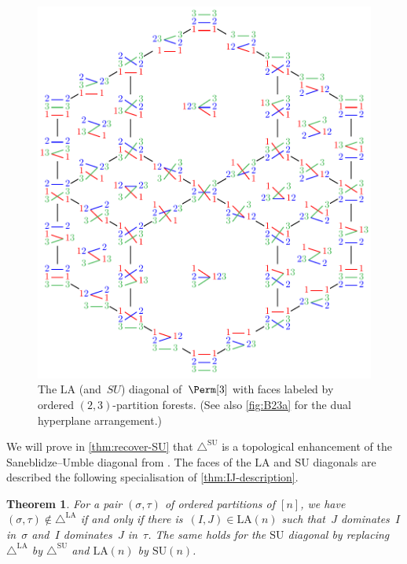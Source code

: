 \documentclass{amsart}
\newtheorem{theorem}{Theorem}[section]
\theoremstyle{definition}
\newcommand{\SU}{\mathrm{SU}}
\newcommand{\LA}{\mathrm{LA}}
\newcommand{\SUD}{\triangle^{\mathrm{SU}}}
\newcommand{\LAD}{\triangle^{\mathrm{LA}}}
\begin{document}
\begin{figure}
	\centerline{\includegraphics[scale=1]{diagonalPermutahedron3}}
	\caption{The $\LA$ (and~$SU$) diagonal of~$\Perm[3]$ with faces labeled by ordered $(2,3)$-partition forests. (See also \cref{fig:B23a} for the dual hyperplane arrangement.)}
	\label{fig:LUSAdiagonals}
\end{figure}

We will prove in \cref{thm:recover-SU} that $\SUD$ is a topological enhancement of the Saneblidze--Umble diagonal from \cite{SaneblidzeUmble}.
The faces of the $\LA$ and $\SU$ diagonals are described the following specialisation of \cref{thm:IJ-description}.

\begin{theorem}
\label{thm:minimal}
For a pair $(\sigma,\tau)$ of ordered partitions of $[n]$, we have~$(\sigma,\tau) \notin \LAD$ if and only if there is~$(I,J) \in \LA(n)$ such that~$J$ dominates~$I$ in~$\sigma$ and~$I$ dominates~$J$ in~$\tau$.
The same holds for the $\SU$ diagonal by replacing $\LAD$ by $\SUD$ and $\LA(n)$ by $\SU(n)$.
\end{theorem}
\end{document}
